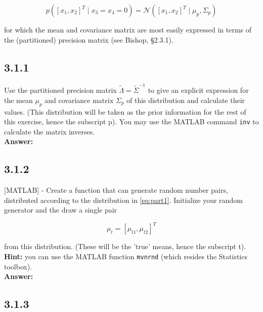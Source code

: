 \documentclass[a4paper]{article}
\begin{document}
\begin{equation}
p([x_1,x_2]^T \; | \; x_3 = x_4 = 0) = \mathcal{N}([x_1,x_2]^T \; | \; \mu_p, \Sigma_p) \label{eq:part1}
\end{equation}

for which the mean and covariance matrix are most easily expressed in terms of the (partitioned) precision matrix (see Bishop, §2.3.1).



\subsection*{3.1.1}

Use the partitioned precision matrix $\tilde{\Lambda} = \tilde{\Sigma}^{-1}$ to give an explicit expression for the mean $\mu_p$ and covariance matrix $\Sigma_p$ of this distribution and calculate their values. (This distribution will be taken as the prior information for the rest of this exercise, hence the subscript p). You may use the MATLAB command \texttt{inv} to calculate the matrix inverses.\\

\textbf{Answer:}\\



\subsection*{3.1.2}

[MATLAB] - Create a function that can generate random number pairs, distributed according to the distribution in \ref{eq:part1}. Initialize your random generator and the draw a single pair

\begin{equation}
	\mu_t = [\mu_{t1}, \mu_{t2}]^T
\end{equation}

from this distribution. (These will be the 'true' means, hence the subscript t).\\

\textbf{Hint:} you can use the MATLAB function \texttt{mvnrnd} (which resides the Statistics toolbox).\\

\textbf{Answer:}\\




\subsection*{3.1.3}
\end{document}
